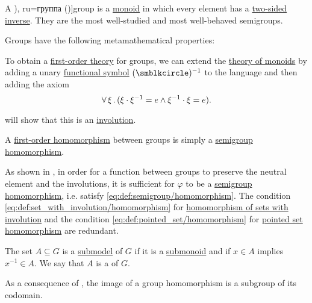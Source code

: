 \begin{definition}\label{def:group}
  A \term[bg=група (\cite[def. IV.2]{ГеновМиховскиМоллов1991}), ru=группа (\cite[def. 4.1.2]{Винберг2014})]{group} is a \hyperref[def:monoid]{monoid} in which every element has a \hyperref[def:monoid_inverse]{two-sided inverse}. They are the most well-studied and most well-behaved semigroups.

  Groups have the following metamathematical properties:
  \begin{thmenum}
     To obtain a \hyperref[def:first_order_theory]{first-order theory} for groups, we can extend the \hyperref[def:monoid/theory]{theory of monoids} by adding a unary \hyperref[def:first_order_language/fun]{functional symbol} \( (\anon)^{-1} \) to the language and then adding the axiom
    \begin{equation}\label{eq:def:group/theory/inverse_axiom}
      \forall \thinspace \xi \thinspace . \thinspace (\xi \cdot \xi^{-1} = e \wedge \xi^{-1} \cdot \xi = e).
    \end{equation}

     will show that this is an \hyperref[def:involution]{involution}.

     A \hyperref[def:first_order_homomorphism]{first-order homomorphism} between groups is simply a \hyperref[def:semigroup/homomorphism]{semigroup homomorphism}.

    As shown in , in order for a function between groups to preserve the neutral element and the involutions, it is sufficient for \( \varphi \) to be a \hyperref[def:semigroup/homomorphism]{semigroup homomorphism}, i.e. satisfy \eqref{eq:def:semigroup/homomorphism}. The condition \eqref{eq:def:set_with_involution/homomorphism} for \hyperref[def:set_with_involution/homomorphism]{homomorphism of sets with involution} and the condition \eqref{eq:def:pointed_set/homomorphism} for \hyperref[def:pointed_set/homomorphism]{pointed set homomorphism} are redundant.

     The set \( A \subseteq G \) is a \hyperref[def:first_order_submodel]{submodel} of \( G \) if it is a \hyperref[def:monoid/submodel]{submonoid} and if \( x \in A \) implies \( x^{-1} \in A \). We say that \( A \) is a  of \( G \).

    As a consequence of , the image of a group homomorphism is a subgroup of its codomain.


\end{thmenum}
\end{definition}
